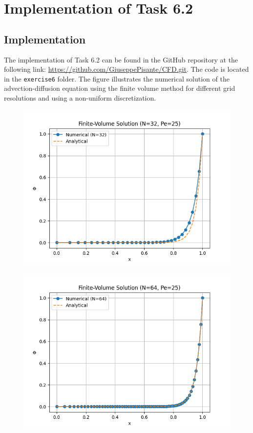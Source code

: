 \documentclass{article}
\begin{document}
\section{Implementation of Task 6.2}

\subsection{Implementation}
The implementation of Task 6.2 can be found in the GitHub repository at the following link: \url{https://github.com/GiuseppePisante/CFD.git}. 
The code is located in the \texttt{exercise6} folder. The figure illustrates the numerical solution of the advection-diffusion equation using 
the finite volume method for different grid resolutions and using a non-uniform discretization. 

\begin{figure}[h!]
  \centering
  \begin{minipage}{0.32\textwidth}
      \centering
      \includegraphics[width=\textwidth]{FVM_32.png}
      \label{fig:32}
  \end{minipage} \hfill
  \begin{minipage}{0.32\textwidth}
      \centering
      \includegraphics[width=\textwidth]{FVM_64.png}

\end{minipage}
\end{figure}
\end{document}
